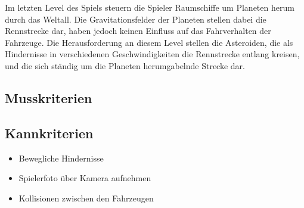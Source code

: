 Im letzten Level des Spiels steuern die Spieler Raumschiffe um Planeten herum durch das Weltall. Die Gravitationsfelder der Planeten stellen dabei die Rennstrecke dar, haben jedoch keinen Einfluss auf das Fahrverhalten der Fahrzeuge. Die Herausforderung an diesem Level stellen die Asteroiden, die als Hindernisse in verschiedenen Geschwindigkeiten die Rennstrecke entlang kreisen, und die sich ständig um die Planeten herumgabelnde Strecke dar.

\subsection{Musskriterien}

\subsection{Kannkriterien}

\begin{itemize}
\item Bewegliche Hindernisse
\item Spielerfoto über Kamera aufnehmen
\item Kollisionen zwischen den Fahrzeugen
\end{itemize}

